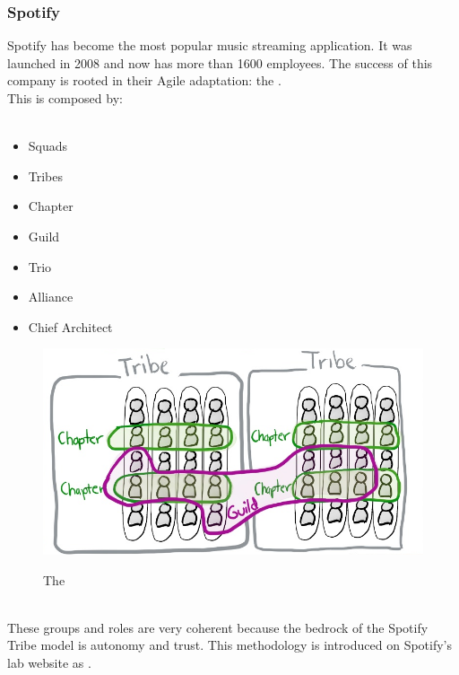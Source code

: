 	\subsubsection{Spotify}
		Spotify has become the most popular music streaming application.
		It was launched in 2008 and now has more than 1600 employees.
		The success of this company is rooted in their Agile adaptation: the .\\
		This is composed by:\\\\
		\begin{minipage}[c]{0.25\textwidth}
			\begin{itemize}
				\item Squads
				\item Tribes
				\item Chapter
				\item Guild
				\item Trio
				\item Alliance
				\item Chief Architect
			\end{itemize}
		\end{minipage}
		\hfill
		\begin{minipage}[c]{0.70\textwidth}
			\vspace{-2cm}
			\begin{figure}[H]
				\centering
				\includegraphics[width=\textwidth]{resources/spot}\\
				\caption{The }
			\end{figure}
		\end{minipage}\\
		These groups and roles are very coherent because the bedrock of the Spotify Tribe model is autonomy and trust\cite{exploring-key-elements-of-spotifys}.
		This methodology is introduced on Spotify's lab website as \cite{spotify-engineering-culture}.
		
